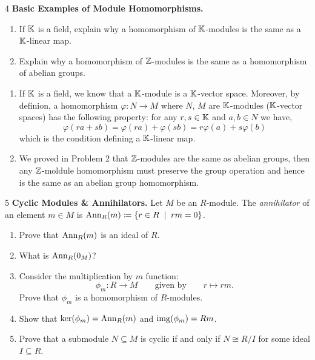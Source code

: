 \documentclass[Notebook.tex]{subfiles}
\begin{document}
    \newpage 

    \hrulefill

    \begin{problem}{4}
        \textbf{Basic Examples of Module Homomorphisms.} 
        \begin{enumerate}
            \item If $\mathbb K$ is a field, explain why a homomorphism of $\mathbb K$-modules is the same as a $\mathbb K$-linear map. 
            \item Explain why a homomorphism of $\mathbb Z$-modules is the same as a homomorphism of abelian groups. 
        \end{enumerate} 
    \end{problem}

    \begin{solution}
        \bbni
        \begin{enumerate}
            \item If $\mathbb K$ is a field, we know that a $\mathbb K$-module is a $\mathbb K$-vector space. Moreover, by definion, a homomorphism $\varphi: N \to M$ where $N, \, M$ are $\mathbb K$-modules ($\mathbb K$-vector spaces) has the following property: for any $r, s \in \mathbb K$ and $a, b \in N$ we have, 
            \[\varphi(ra + sb) = \varphi(ra) + \varphi(sb) = r\varphi(a) + s \varphi(b)\]
            which is the condition defining a $\mathbb K$-linear map. 

            \item We proved in Problem 2 that $\mathbb Z$-modules are the same as abelian groups, then any $\mathbb Z$-moldule homomorphism must preserve the group operation and hence is the same as an abelian group homomorphism. 
        \end{enumerate}
    \end{solution}

    \newpage 

    \begin{problem}{5}
        \textbf{Cyclic Modules \& Annihilators.} Let $M$ be an $R$-module. The \emph{annihilator} of an element $m\in M$ is $\operatorname{\text{Ann}}_{R}(m)\coloneqq \{r \in R\;\mid\; rm = 0 \}$. 
        \begin{enumerate}
        \item Prove that $\operatorname{\text{Ann}}_{R}(m)$ is an ideal of $R$.
        \item What is $\operatorname{\text{Ann}}_{R}(0_{M})$?
        \item Consider the multiplication by $m$ function: 
        \[
        \phi_{m}:R \to M \quad \quad \text{given by} \quad \quad r \mapsto rm.
        \]
        Prove that $\phi_{m}$ is a homomorphism of $R$-modules.
        \item Show that $\ker(\phi_m)=\operatorname{\text{Ann}}_{R}(m)$ and $\operatorname{img}(\phi_m)=Rm$. 
        \item Prove that a submodule $N \subseteq M$ is cyclic if and only if $N \cong R/I$ for some ideal $I \subseteq R$. 
        \end{enumerate}
    \end{problem}
\end{document}
